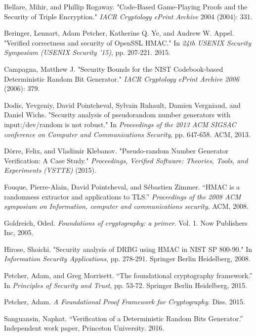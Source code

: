 \documentclass[12pt,lot, lof]{puthesis}
\begin{document}
{\begin{thebibliography}{99}
Bellare, Mihir, and Phillip Rogaway. "Code-Based Game-Playing Proofs and the Security of Triple Encryption." \emph{IACR Cryptology ePrint Archive} 2004 (2004): 331.

Beringer, Lennart, Adam Petcher, Katherine Q. Ye, and Andrew W. Appel. "Verified correctness and security of OpenSSL HMAC." In \emph{24th USENIX Security Symposium (USENIX Security '15)}, pp. 207-221. 2015.

Campagna, Matthew J. "Security Bounds for the NIST Codebook-based Deterministic Random Bit Generator." \emph{IACR Cryptology ePrint Archive 2006} (2006): 379.

Dodis, Yevgeniy, David Pointcheval, Sylvain Ruhault, Damien Vergniaud, and Daniel Wichs. "Security analysis of pseudorandom number generators with input:/dev/random is not robust." In \emph{Proceedings of the 2013 ACM SIGSAC conference on Computer and Communications Security}, pp. 647-658. ACM, 2013.

D{\"o}rre, Felix, and Vladimir Klebanov. "Pseudo-random Number Generator Verification: A Case Study." \emph{Proceedings, Verified Software: Theories, Tools, and Experiments (VSTTE)} (2015).

Fouque, Pierre-Alain, David Pointcheval, and Sébastien Zimmer. ``HMAC is a randomness extractor and applications to TLS.'' \emph{Proceedings of the 2008 ACM symposium on Information, computer and communications security.} ACM, 2008.

Goldreich, Oded. \emph{Foundations of cryptography: a primer}. Vol. 1. Now Publishers Inc, 2005.

Hirose, Shoichi. "Security analysis of DRBG using HMAC in NIST SP 800-90." In \emph{Information Security Applications}, pp. 278-291. Springer Berlin Heidelberg, 2008.

Petcher, Adam, and Greg Morrisett. ``The foundational cryptography framework.'' In \emph{Principles of Security and Trust}, pp. 53-72. Springer Berlin Heidelberg, 2015.

Petcher, Adam. \emph{A Foundational Proof Framework for Cryptography.} Diss. 2015.

Sanguansin, Naphat. ``Verification of a Deterministic Random Bits Generator.'' Independent work paper, Princeton University. 2016.


\end{thebibliography}}
\end{document}
